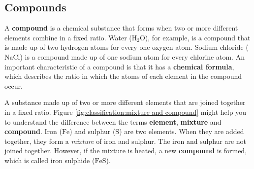             \subsection*{Compounds}
            \nopagebreak
        \label{m38708*id63363}A \textbf{compound} is a chemical substance that forms when two or more different elements combine in a fixed ratio. Water ($\text{H}{}_{2}\text{O}$), for example, is a compound that is made up of two hydrogen atoms for every one oxygen atom. Sodium chloride ($\text{NaCl}$) is a compound made up of one sodium atom for every chlorine atom. An important characteristic of a compound is that it has a \textbf{chemical formula}, which describes the ratio in which the atoms of each element in the compound occur.\par 
\label{m38708*fhsst!!!underscore!!!id201}
 { \label{m38708*meaningfhsst!!!underscore!!!id201}
        A substance made up of two or more different elements that are joined together in a fixed ratio.
         } 
        \label{m38708*id63410} Figure \ref{fig:classification:mixture and compound} might help you to understand the difference between the terms \textbf{element}, \textbf{mixture} and \textbf{compound}. Iron ($\text{Fe}$) and sulphur ($\text{S}$) are two elements. When they are added together, they form a \textsl{mixture} of iron and sulphur. The iron and sulphur are not joined together. However, if the mixture is heated, a new \textbf{compound} is formed, which is called iron sulphide ($\text{FeS}$). \par 
